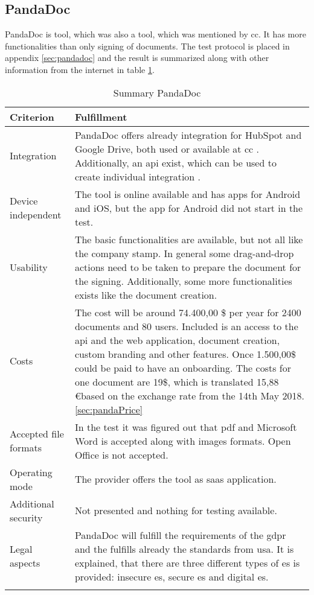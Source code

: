 \subsection{PandaDoc}
PandaDoc is tool, which was also a tool, which was mentioned by \gls{cc}. It has more functionalities than only signing of documents. The test protocol is placed in appendix \ref{sec:pandadoc} and the result is summarized along with other information from the internet in table \ref{tab:pandadoc}. 
	\begin{longtable}{|p{4cm}|p{10cm}|} \hline
		Criterion & Fulfillment \\ \hline
		Integration & PandaDoc offers already integration for HubSpot and Google Drive, both used or available at \gls{cc} \parencite{pandadoc2018integration}. Additionally, an \gls{api} exist, which can be used to create individual integration \parencite{pandadoc2018api}. \\ \hline
		Device independent & The tool is online available and has \glspl{app} for Android and iOS, but the \gls{app} for Android did not start in the test. \\ \hline
		Usability & The basic functionalities are available, but not all like the company stamp. In general some drag-and-drop actions need to be taken to prepare the document for the signing. Additionally, some more functionalities exists like the document creation.\\ \hline
		Costs & The cost will be around 74.400,00 \$ per year for 2400 documents and 80 users. Included is an access to the \gls{api} and the web application, document creation, custom branding and other features. Once 1.500,00\$ could be paid to have an onboarding. The costs for one document are 19\$, which is translated 15,88 \euro based on the exchange rate from the 14th May 2018. \ref{sec:pandaPrice} \\ \hline
		Accepted file formats & In the test it was figured out that \gls{pdf} and Microsoft Word is accepted along with images formats. Open Office is not accepted. \\ \hline
		Operating mode & The provider offers the tool as \gls{saas} application. \parencite{pandadoc2018saas} \\ \hline
		Additional security & Not presented and nothing for testing available. \\ \hline
		Legal aspects & PandaDoc will fulfill the requirements of the \gls{gdpr} and the fulfills already the standards from \gls{usa}. It is explained, that there are three different types of \gls{es} is provided: insecure \gls{es}, secure \gls{es} and digital \gls{es}.  \parencite{pandadoc2018gdpr,pandadoc2018legal} \\ \hline
	\caption{Summary PandaDoc}
	\label{tab:pandadoc}
	\end{longtable}

